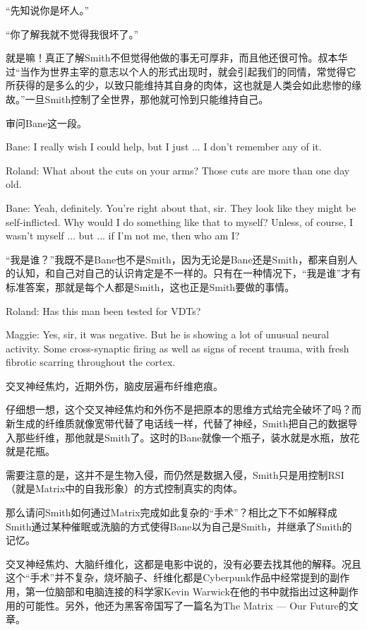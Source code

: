 \documentclass[UTF8]{ctexart}
\newenvironment{myquote}{\color{green} \setlength{\leftskip}{6em} \setlength{\rightskip}{4em} \setlength{\parindent}{-2em}}{\par}
\begin{document}
“先知说你是坏人。”

“你了解我就不觉得我很坏了。”

就是嘛！真正了解Smith不但觉得他做的事无可厚非，而且他还很可怜。叔本华过“当作为世界主宰的意志以个人的形式出现时，就会引起我们的同情，常觉得它所获得的是多么的少，以致只能维持其自身的肉体，这也就是人类会如此悲惨的缘故。”一旦Smith控制了全世界，那他就可怜到只能维持自己。

审问Bane这一段。

\begin{myquote}
Bane: I really wish I could help, but I just ... I don't remember any of it.

Roland: What about the cuts on your arms? Those cuts are more than one day old.

Bane: Yeah, definitely. You're right about that, sir. They look like they might be self-inflicted. Why would I do something like that to myself? Unless, of course, I wasn't myself ... but ... if I'm not me, then who am I?
\end{myquote}

“我是谁？”我既不是Bane也不是Smith，因为无论是Bane还是Smith，都来自别人的认知，和自己对自己的认识肯定是不一样的。只有在一种情况下，“我是谁”才有标准答案，那就是每个人都是Smith，这也正是Smith要做的事情。

\begin{myquote}
Roland: Has this man been tested for VDTs?

Maggie: Yes, sir, it was negative. But he is showing a lot of unusual neural activity. Some cross-synaptic firing as well as signs of recent trauma, with fresh fibrotic scarring throughout the cortex.
\end{myquote}

交叉神经焦灼，近期外伤，脑皮层遍布纤维疤痕。

仔细想一想，这个交叉神经焦灼和外伤不是把原本的思维方式给完全破坏了吗？而新生成的纤维质就像宽带代替了电话线一样，代替了神经，Smith把自己的数据导入那些纤维，那他就是Smith了。这时的Bane就像一个瓶子，装水就是水瓶，放花就是花瓶。

需要注意的是，这并不是生物入侵，而仍然是数据入侵，Smith只是用控制RSI（就是Matrix中的自我形象）的方式控制真实的肉体。

那么请问Smith如何通过Matrix完成如此复杂的“手术”？相比之下不如解释成Smith通过某种催眠或洗脑的方式使得Bane以为自己是Smith，并继承了Smith的记忆。

交叉神经焦灼、大脑纤维化，这都是电影中说的，没有必要去找其他的解释。况且这个“手术”并不复杂，烧坏脑子、纤维化都是Cyberpunk作品中经常提到的副作用，第一位脑部和电脑连接的科学家Kevin Warwick在他的书中就指出过这种副作用的可能性。另外，他还为黑客帝国写了一篇名为The Matrix --- Our Future的文章。
\end{document}
